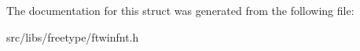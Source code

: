 The documentation for this struct was generated from the following file:\begin{DoxyCompactItemize}
\item 
src/libs/freetype/ftwinfnt.h\end{DoxyCompactItemize}
